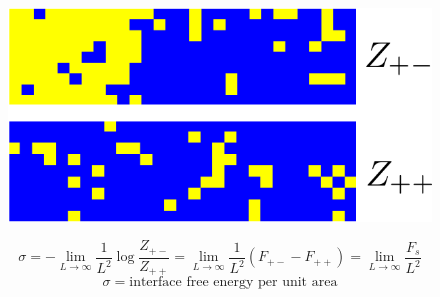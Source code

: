\documentclass[12pt,handout]{beamer}
\begin{document}
\begin{frame}
\begin{center}
\begin{figure}[!htb]
\centering
\includegraphics[scale=0.50]{comparison.png}
\end{figure}
\[
\sigma = -\lim_{L \rightarrow \infty} \frac{1}{L^2} \log \frac{Z_{+-}}{Z_{++}} = \lim_{L \rightarrow \infty} \frac{1}{L^2} \left( F_{+-} - F_{++} \right) = \lim_{L \rightarrow \infty} \frac{F_s}{L^2}
\]
\[\sigma = \text{interface free energy per unit area}\]


\end{center}
\end{frame}
\end{document}
